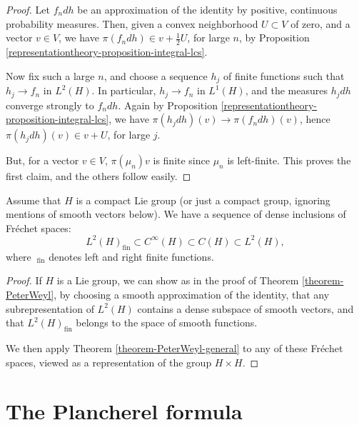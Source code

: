 \begin{proof}
Let $f_n dh$ be an approximation of the identity by positive, continuous probability measures. Then, given a convex neighborhood $U\subset V$ of zero, and a vector $v\in V$, we have $\pi(f_n dh)\in v+\frac{1}{2}U$, for large $n$, by Proposition \ref{representationtheory-proposition-integral-lcs}. 

Now fix such a large $n$, and choose a sequence $h_j$ of finite functions such that $h_j\to f_n$ in $L^2(H)$. In particular, $h_j\to f_n$ in $L^1(H)$, and the measures $h_j dh$ converge strongly to $f_n dh$. Again by Proposition \ref{representationtheory-proposition-integral-lcs}, we have $\pi(h_j dh)(v)\to \pi(f_n dh)(v)$, hence $\pi(h_j dh)(v)\in v+U$, for large $j$. 


But, for a vector $v\in V$, $\pi(\mu_n)v$ is finite since $\mu_n$ is left-finite. This proves the first claim, and the others follow easily.

\end{proof}




\begin{proposition}
\label{proposition-denseinclusions} 
Assume that $H$ is a compact Lie group (or just a compact group, ignoring mentions of smooth vectors below). We have a sequence of dense inclusions of Fr\'echet spaces:
\begin{equation}
 L^2(H)_{\text{fin}} \subset C^\infty(H) \subset C(H)\subset L^2(H),
\end{equation}
where $~_{\text{fin}}$ denotes left and right finite functions.
\end{proposition}

\begin{proof}
If $H$ is a Lie group, we can show as in the proof of Theorem \ref{theorem-PeterWeyl}, by choosing a smooth approximation of the identity, that any subrepresentation of $L^2(H)$ contains a dense subspace of smooth vectors, and that $L^2(H)_{\text{fin}}$ belongs to the space of smooth functions. 


We then apply Theorem \ref{theorem-PeterWeyl-general} to any of these Fr\'echet spaces, viewed as a representation of the group $H\times H$. 
\end{proof}



\section{The Plancherel formula}
\label{section-Plancherel}

